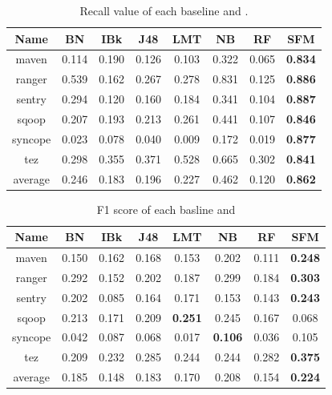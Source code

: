 \begin{table}[!ht]
\caption{Recall value of each baseline and \simfinmo.}
\centering
\begin{tabular}{|c|c|c|c|c|c|c|c|}
\hline
Name & BN & IBk & J48 & LMT & NB & RF & SFM \\ \hline
maven & 0.114 & 0.190 & 0.126 & 0.103 & 0.322 & 0.065 & \textbf{0.834} \\ \hline
ranger & 0.539 & 0.162 & 0.267 & 0.278 & 0.831 & 0.125 & \textbf{0.886} \\ \hline
sentry & 0.294 & 0.120 & 0.160 & 0.184 & 0.341 & 0.104 & \textbf{0.887} \\ \hline
sqoop & 0.207 & 0.193 & 0.213 & 0.261 & 0.441 & 0.107 & \textbf{0.846} \\ \hline
syncope & 0.023 & 0.078 & 0.040 & 0.009 & 0.172 & 0.019 & \textbf{0.877} \\ \hline
tez & 0.298 & 0.355 & 0.371 & 0.528 & 0.665 & 0.302 & \textbf{0.841} \\ \hline
average & 0.246 & 0.183 & 0.196 & 0.227 & 0.462 & 0.120 & \textbf{0.862} \\ \hline
\end{tabular}%
\label{tab:recall}
\end{table}


\begin{table}[!ht]
\caption{F1 score of each basline and \simfinmo}
\centering
\begin{tabular}{|c|c|c|c|c|c|c|c|}
\hline
Name & BN & IBk & J48 & LMT & NB & RF & SFM \\ \hline
maven & 0.150 & 0.162 & 0.168 & 0.153 & 0.202 & 0.111 & \textbf{0.248} \\ \hline
ranger & 0.292 & 0.152 & 0.202 & 0.187 & 0.299 & 0.184 & \textbf{0.303} \\ \hline
sentry & 0.202 & 0.085 & 0.164 & 0.171 & 0.153 & 0.143 & \textbf{0.243} \\ \hline
sqoop & 0.213 & 0.171 & 0.209 & \textbf{0.251} & 0.245 & 0.167 & 0.068 \\ \hline
syncope & 0.042 & 0.087 & 0.068 & 0.017 & \textbf{0.106} & 0.036 & 0.105 \\ \hline
tez & 0.209 & 0.232 & 0.285 & 0.244 & 0.244 & 0.282 & \textbf{0.375} \\ \hline
average & 0.185 & 0.148 & 0.183 & 0.170 & 0.208 & 0.154 & \textbf{0.224} \\ \hline
\end{tabular}%
\label{tab:f1score}
\end{table}


